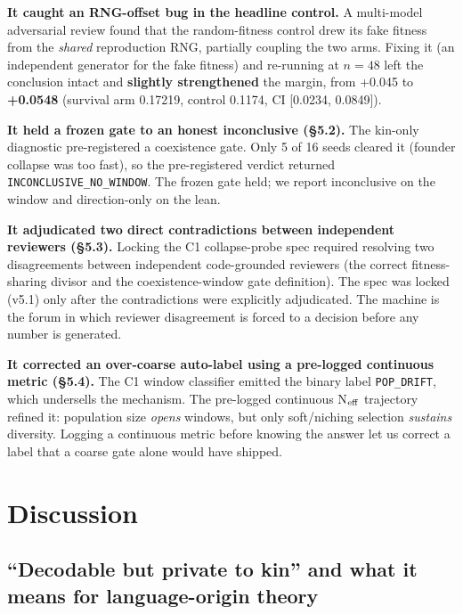 \documentclass[12pt,letterpaper]{article}
\begin{document}
\textbf{It caught an RNG-offset bug in the headline control.} A multi-model adversarial
review found that the random-fitness control drew its fake fitness from the \emph{shared}
reproduction RNG, partially coupling the two arms. Fixing it (an independent generator for
the fake fitness) and re-running at $n{=}48$ left the conclusion intact and \textbf{slightly
strengthened} the margin, from +0.045 to \textbf{+0.0548} (survival arm 0.17219, control
0.1174, CI [0.0234, 0.0849]).

\textbf{It held a frozen gate to an honest inconclusive (\S5.2).} The kin-only diagnostic
pre-registered a coexistence gate. Only 5 of 16 seeds cleared it (founder collapse was too
fast), so the pre-registered verdict returned \texttt{INCONCLUSIVE\_NO\_WINDOW}. The frozen
gate held; we report inconclusive on the window and direction-only on the lean.

\textbf{It adjudicated two direct contradictions between independent reviewers (\S5.3).}
Locking the C1 collapse-probe spec required resolving two disagreements between independent
code-grounded reviewers (the correct fitness-sharing divisor and the coexistence-window gate
definition). The spec was locked (v5.1) only after the contradictions were explicitly
adjudicated. The machine is the forum in which reviewer disagreement is forced to a decision
before any number is generated.

\textbf{It corrected an over-coarse auto-label using a pre-logged continuous metric (\S5.4).}
The C1 window classifier emitted the binary label \texttt{POP\_DRIFT}, which undersells the
mechanism. The pre-logged continuous N$_{\rm eff}$ trajectory refined it: population size
\emph{opens} windows, but only soft/niching selection \emph{sustains} diversity. Logging a
continuous metric before knowing the answer let us correct a label that a coarse gate alone
would have shipped.

\section{Discussion}

\subsection{``Decodable but private to kin'' and what it means for language-origin theory}
\end{document}
